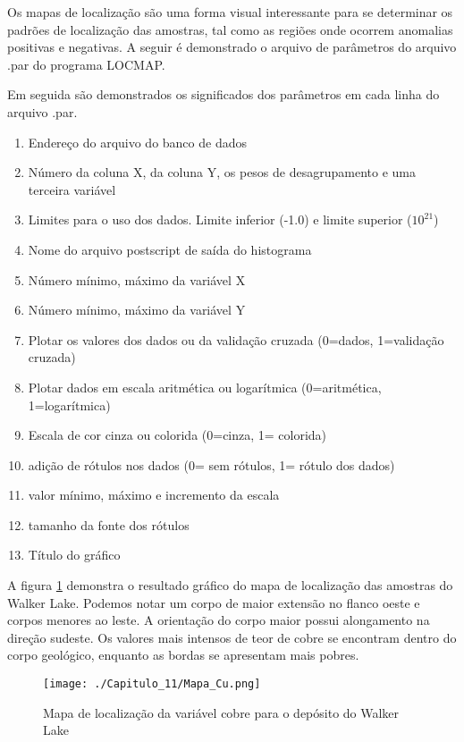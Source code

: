 Os mapas de localização são uma forma visual interessante para se determinar os padrões de localização das amostras, tal como as regiões onde ocorrem anomalias positivas e negativas. A seguir é demonstrado o arquivo de parâmetros do arquivo .par do programa LOCMAP. 

\begin{small}
\begingroup
{}

\endgroup
\end{small}

Em seguida são demonstrados os significados dos parâmetros em cada linha do arquivo .par.

\begin{enumerate}
	\item Endereço do arquivo do banco de dados 
	\item Número da coluna X, da coluna Y, os pesos de desagrupamento e uma terceira variável  
	\item Limites para o uso dos dados. Limite inferior (-1.0) e limite superior ($10 ^{21} $)
	\item Nome do arquivo postscript de saída do histograma 
	\item Número mínimo, máximo da variável X 
	\item Número mínimo, máximo da variável Y 
	\item Plotar os valores dos dados ou da validação cruzada (0=dados, 1=validação cruzada)
	\item Plotar dados em escala aritmética ou logarítmica (0=aritmética, 1=logarítmica)
	\item Escala de cor cinza ou colorida (0=cinza, 1= colorida)
	\item adição de rótulos nos dados (0= sem rótulos, 1= rótulo dos dados)
	\item valor mínimo, máximo e incremento da escala 
	\item tamanho da fonte dos rótulos
	\item Título do gráfico
\end{enumerate}

A figura \ref{scatplot_gslib} demonstra o resultado gráfico do mapa de localização das amostras do Walker Lake. Podemos notar um corpo de maior extensão no flanco oeste e corpos menores ao leste. A orientação do corpo maior possui alongamento na direção sudeste. Os valores mais intensos de teor de cobre se encontram dentro do corpo geológico, enquanto as bordas se apresentam mais pobres.
 
\FloatBarrier
\begin{figure}[h]
	\centering
	\texttt{[image: ./Capitulo\_11/Mapa\_Cu.png]}	
	\caption{ Mapa de localização da variável cobre para o depósito do Walker Lake}
	\label{scatplot_gslib}
\end{figure}
\FloatBarrier

